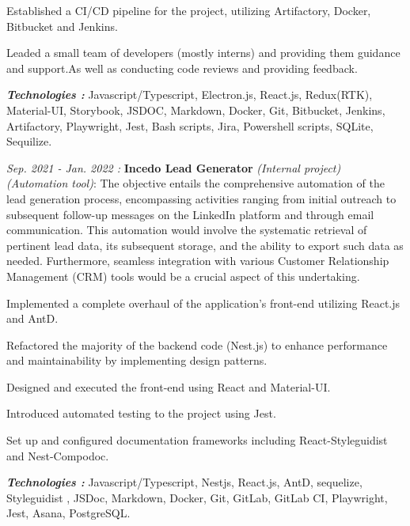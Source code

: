 \begin{cventries}
{\begin{cvitems}
{\begin{cvitems}
          \item {Established a CI/CD pipeline for the project, utilizing Artifactory, Docker, Bitbucket and Jenkins.}
          \item {Leaded a small team of developers (mostly interns) and providing them guidance and support.As well as conducting code reviews and providing feedback.}
        \end{cvitems}
        \vspace{5mm}
        \textbf{\textit{Technologies :}} Javascript/Typescript, Electron.js, React.js, Redux(RTK), Material-UI, Storybook, JSDOC, Markdown, Docker, Git, Bitbucket, Jenkins, Artifactory, Playwright, Jest, Bash scripts, Jira, Powershell scripts, SQLite, Sequilize.
        \vspace{5mm}
        }
        \item {
          \textit{Sep. 2021 - Jan. 2022 : }\textbf{Incedo Lead Generator} \textit{(Internal project)} \textit{(Automation tool)}:
          \newline The objective entails the comprehensive automation of the lead generation process, encompassing activities ranging from initial outreach to subsequent follow-up messages on the LinkedIn platform and through email communication. This automation would involve the systematic retrieval of pertinent lead data, its subsequent storage, and the ability to export such data as needed. Furthermore, seamless integration with various Customer Relationship Management (CRM) tools would be a crucial aspect of this undertaking.
        \vspace{5mm}
      \begin{cvitems}
        \item {Implemented a complete overhaul of the application's front-end utilizing React.js and AntD.}
        \item {Refactored the majority of the backend code (Nest.js) to enhance performance and maintainability by implementing design patterns.}
        \item {Designed and executed the front-end using React and Material-UI.}
        \item {Introduced automated testing to the project using Jest.}
        \item {Set up and configured documentation frameworks including React-Styleguidist and Nest-Compodoc.}
      \end{cvitems}
      \vspace{5mm}
      \textbf{\textit{Technologies :}} Javascript/Typescript, Nestjs, React.js, AntD, sequelize, Styleguidist , JSDoc, Markdown, Docker, Git, GitLab, GitLab CI, Playwright, Jest, Asana, PostgreSQL.
      \vspace{5mm}}
       \end{cvitems}
    }


\end{cventries}
